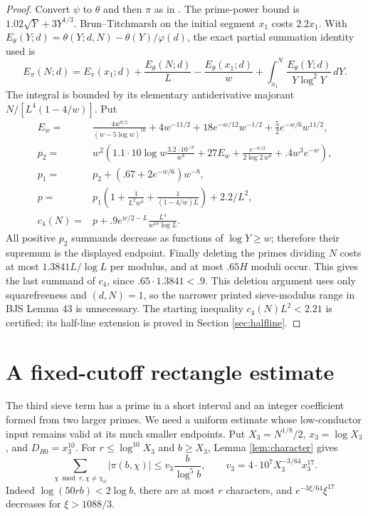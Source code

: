 \documentclass[11pt]{article}
\theoremstyle{remark}\newtheorem{remark}[theorem]{Remark}
\begin{document}
\begin{proof}
Convert $\psi$ to $\theta$ and then $\pi$ as in
\cite[Lemma 31, source label \texttt{small533}]{BJS}.
The prime-power bound is $1.02\sqrt Y+3Y^{1/3}$.
Brun--Titchmarsh on the initial segment $x_1$ costs $2.2x_1$.
With $E_\theta(Y;d)=\theta(Y;d,N)-\theta(Y)/\varphi(d)$, the exact
partial summation identity used is
\[
E_\pi(N;d)=E_\pi(x_1;d)+\frac{E_\theta(N;d)}L
-\frac{E_\theta(x_1;d)}w+
\int_{x_1}^{N}\frac{E_\theta(Y;d)}{Y\log^2Y}\,dY.
\]
The integral is bounded by its elementary antiderivative majorant
$N/[L^4(1-4/w)]$. Put
\begin{align*}
E_w={}&\frac{4w^{9/2}}{(w-5\log w)^{10}}+4w^{-11/2}
+18e^{-w/12}w^{-1/2}+\frac52e^{-w/6}w^{11/2},\\
p_2={}&w^2\left(1.1\cdot10\log w\frac{3.2\cdot10^{-8}}{w^8}
+27E_w+\frac{e^{-w/2}}{2\log2\,w^8}+.4w^3e^{-w}\right),\\
p_1={}&p_2+(.67+2e^{-w/6})w^{-8},\\
p={}&p_1\left(1+\frac1{L^2w^3}+\frac1{(1-4/w)L}\right)+2.2/L^2,\\
c_4(N)={}&p+.9e^{w/2-L}\frac{L^4}{w^{10}\log L}.
\end{align*}
All positive $p_2$ summands decrease as functions of $\log Y\ge w$;
therefore their supremum is the displayed endpoint.
Finally deleting the primes dividing $N$ costs at most
$1.3841L/\log L$ per modulus, and at most $.65H$ moduli occur.
This gives the last summand of $c_4$, since $.65\cdot1.3841<.9$.
This deletion argument uses only squarefreeness and $(d,N)=1$,
so the narrower printed sieve-modulus range in BJS Lemma 43 is unnecessary.
The starting inequality $c_4(N)L^2<2.21$ is certified; its half-line
extension is proved in Section \ref{sec:halfline}.
\end{proof}

\section{A fixed-cutoff rectangle estimate}\label{sec:rectangle}
The third sieve term has a prime in a short interval and an integer
coefficient formed from two larger primes. We need a uniform estimate
whose low-conductor input remains valid at its much smaller endpoints.
Put $X_3=N^{1/8}/2$, $x_3=\log X_3$, and $D_{R0}=x_3^{10}$.
For $r\le\log^{10}X_3$ and $b\ge X_3$, Lemma \ref{lem:character} gives
\begin{equation}\label{eq:v}
\sum_{\chi\bmod r,\chi\ne\chi_0}|\pi(b,\chi)|
\le v_3\frac b{\log^5b},\qquad
v_3=4\cdot10^7X_3^{-3/64}x_3^{17}.
\end{equation}
Indeed $\log(50rb)<2\log b$, there are at most $r$ characters,
and $e^{-3\xi/64}\xi^{17}$ decreases for $\xi>1088/3$.
\end{document}
